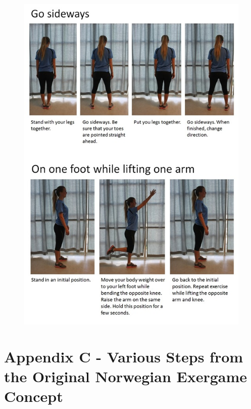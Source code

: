 \begin{figure} [H]
\centering
\includegraphics[scale=0.8]{GoSideways.jpg}
\label{app:gosideways}
\end{figure} 

\newpage
\section*{Appendix C - Various Steps from the Original Norwegian Exergame Concept}
\label{app:concept}

